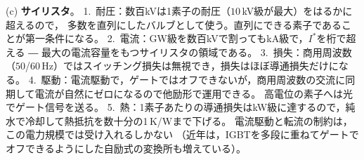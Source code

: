 \begin{enumerate}
(c) \textbf{サイリスタ}。
1.~耐圧：数百kVは1素子の耐圧（$10$\,kV級が最大）をはるかに超えるので，
多数を直列にしたバルブとして使う。直列にできる素子であることが第一条件になる。
2.~電流：GW級を数百kVで割ってもkA級で，$I^*$を桁で超える ― 最大の電流容量をもつサイリスタの領域である。
3.~損失：商用周波数（$50$/$60$\,Hz）ではスイッチング損失は無視でき，損失はほぼ導通損失だけになる。
4.~駆動：電流駆動で，ゲートではオフできないが，商用周波数の交流に同期して電流が自然にゼロになるので他励形で運用できる。
高電位の素子へは光でゲート信号を送る。
5.~熱：1素子あたりの導通損失はkW級に達するので，純水で冷却して熱抵抗を数十分の1\,K/Wまで下げる。
電流駆動と転流の制約は，この電力規模では受け入れるしかない
（近年は，IGBTを多段に重ねてゲートでオフできるようにした自励式の変換所も増えている）。

\end{enumerate}
